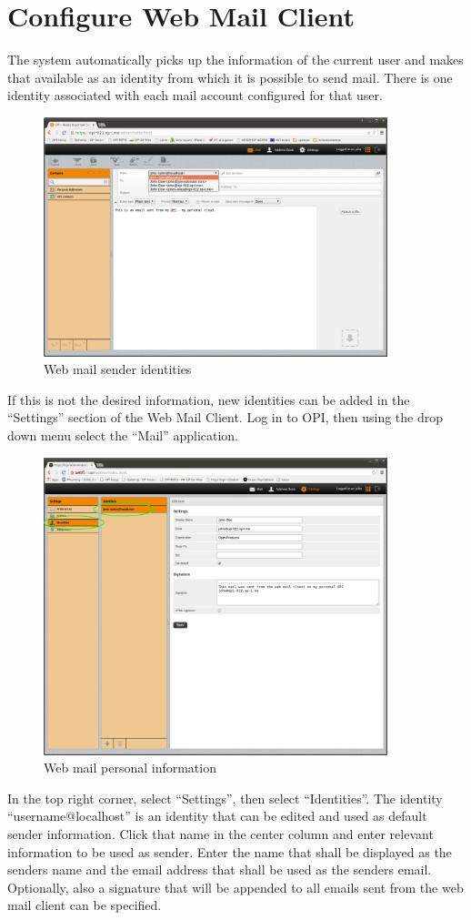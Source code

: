 \documentclass[12pt,a4paper,titlepage]{article}
\begin{document}
\section{Configure Web Mail Client}
The system automatically picks up the information of the current user and makes that available as an identity from which it is possible to send mail. There is one identity associated with each mail account configured for that user.
\begin{figure}[h!]
\centering
\includegraphics[width=10cm]{./img/webmail-send-identities}
\caption{Web mail sender identities}
\end{figure}
\FloatBarrier

If this is not the desired information, new identities can be added in the ``Settings'' section of the Web Mail Client.
Log in to OPI, then using the drop down menu select the ``Mail'' application.
\begin{figure}[h!]
\centering
\includegraphics[width=10cm]{./img/webmail-config}
\caption{Web mail personal information}
\end{figure}
In the top right corner, select ``Settings'', then select ``Identities''.
The identity ``username@localhost'' is an identity that can be edited and used as default sender information.
Click that name in the center column and enter relevant information to be used as sender.
Enter the name that shall be displayed as the senders name and the email address that shall be used as the senders email.
Optionally, also a signature that will be appended to all emails sent from the web mail client can be specified.
\end{document}
